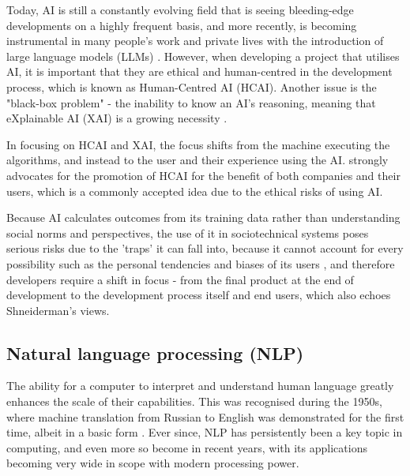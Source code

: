 \documentclass[12pt]{report}
\begin{document}
    Today, AI is still a constantly evolving field that is seeing bleeding-edge developments on a 
    highly frequent basis, and more recently, is becoming instrumental in many people's work and private lives 
    with the introduction of large language models (LLMs) \autocite{AIDigitalAssistants}.
    However, when developing a project that utilises AI, it is important that 
    they are ethical and human-centred in the development process, which is known as Human-Centred AI (HCAI). 
    Another issue is the "black-box problem" - the inability to know an AI's reasoning, meaning that 
    eXplainable AI (XAI) is a growing necessity \autocite{miro-nicolau_comprehensive_2025}. 
    
    In focusing on HCAI and XAI, the focus shifts from the machine executing the algorithms, and instead to the user and their experience 
    using the AI. \textcite{AIEthics} strongly advocates for the 
    promotion of HCAI for the benefit of both companies and their users, which is a commonly accepted 
    idea due to the ethical risks of using AI. 
    
    Because AI calculates outcomes from its training data rather 
    than understanding social norms and perspectives, the use of it in sociotechnical systems poses serious risks 
    due to the 'traps' it can fall into, because it cannot account for every possibility such as the personal tendencies 
    and biases of its users \autocite{selbst_fairness_2019}, and therefore developers require a shift in focus - from the final product
    at the end of development to the development process itself and end users, which also echoes Shneiderman's views. 

    \subsection{Natural language processing (NLP)}

    The ability for a computer to interpret and understand human language greatly enhances the scale of their capabilities. This was 
    recognised during the 1950s, where machine translation from Russian to English was demonstrated for the first time, albeit in a basic form \autocite{zampolli_natural_1994}.
    Ever since, NLP has persistently been a key topic in computing, and even more so become in recent years, with its applications becoming very wide 
    in scope with modern processing power.
\end{document}
